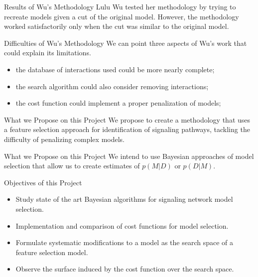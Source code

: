 \documentclass{beamer}
\begin{document}
\begin{frame}{Results of Wu's Methodology}
Lulu Wu tested her methodology by trying to recreate models given a cut
of the original model. \pause However, the methodology worked 
satisfactorily only when the cut was similar to the original model.
\end{frame}


\begin{frame}{Difficulties of Wu's Methodology}
We can point three aspects of Wu's work that could explain its 
limitations.
\begin{itemize}
\pause
\item{the database of interactions used could be more nearly complete;} 
\pause
\item{the search algorithm could also consider removing interactions;}
\pause
\item{the cost function could implement a proper penalization of 
models;}
\end{itemize}
\end{frame}


\begin{frame}{What we Propose on this Project}
We propose to create a methodology that uses a feature selection 
approach for identification of signaling pathways, tackling the 
difficulty of \alert{penalizing complex models}.
\end{frame}

\begin{frame}{What we Propose on this Project}
We intend to use Bayesian approaches of model selection that allow us to
create estimates of $p (M | D)$ or $p (D | M)$.
\end{frame}

\begin{frame}{Objectives of this Project}
\begin{itemize}
\pause
\item{Study state of the art Bayesian algorithms for signaling network
    model selection.}
\pause
\item{Implementation and comparison of cost functions for model
    selection.}
\pause
\item{Formulate systematic modifications to a model as the search space
    of a feature selection model.}
\pause
\item{Observe the surface induced by the cost function over the search
    space.}
\end{itemize}
\end{frame}
\end{document}
